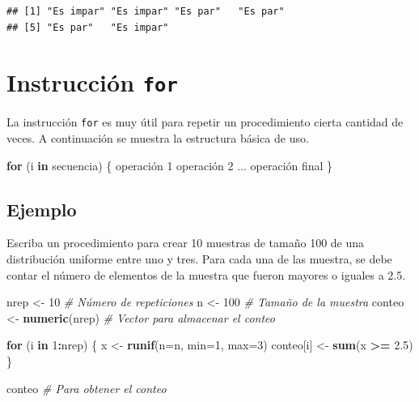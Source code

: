 \documentclass[10pt,]{krantz}
\makeatletter
\newenvironment{Shaded}{\begin{snugshade}}{\end{snugshade}}
\newcommand{\KeywordTok}[1]{\textcolor[rgb]{0.13,0.29,0.53}{\textbf{#1}}}
\newcommand{\DataTypeTok}[1]{\textcolor[rgb]{0.13,0.29,0.53}{#1}}
\newcommand{\DecValTok}[1]{\textcolor[rgb]{0.00,0.00,0.81}{#1}}
\newcommand{\FloatTok}[1]{\textcolor[rgb]{0.00,0.00,0.81}{#1}}
\newcommand{\StringTok}[1]{\textcolor[rgb]{0.31,0.60,0.02}{#1}}
\newcommand{\CommentTok}[1]{\textcolor[rgb]{0.56,0.35,0.01}{\textit{#1}}}
\newcommand{\ControlFlowTok}[1]{\textcolor[rgb]{0.13,0.29,0.53}{\textbf{#1}}}
\newcommand{\OperatorTok}[1]{\textcolor[rgb]{0.81,0.36,0.00}{\textbf{#1}}}
\newcommand{\NormalTok}[1]{#1}
\newenvironment{kframe}{%
\medskip{}
\setlength{\fboxsep}{.8em}
 \def\at@end@of@kframe{}%
 \ifinner\ifhmode%
  \def\at@end@of@kframe{\end{minipage}}%
  \begin{minipage}{\columnwidth}%
 \fi\fi%
 \def\FrameCommand##1{\hskip\@totalleftmargin \hskip-\fboxsep
 \colorbox{shadecolor}{##1}\hskip-\fboxsep
     \hskip-\linewidth \hskip-\@totalleftmargin \hskip\columnwidth}%
 \MakeFramed {\advance\hsize-\width
   \@totalleftmargin\z@ \linewidth\hsize
   \@setminipage}}%
 {\par\unskip\endMakeFramed%
 \at@end@of@kframe}
\renewenvironment{Shaded}{\begin{kframe}}{\end{kframe}}
\makeatother
\begin{document}
\begin{verbatim}
## [1] "Es impar" "Es impar" "Es par"   "Es par"  
## [5] "Es par"   "Es impar"
\end{verbatim}

\section{\texorpdfstring{Instrucción \texttt{for}
}{Instrucción for }}\label{instruccion-for}

La instrucción \texttt{for} es muy útil para repetir un procedimiento
cierta cantidad de veces. A continuación se muestra la estructura básica
de uso.

\begin{Shaded}
\begin{Highlighting}[]
\ControlFlowTok{for}\NormalTok{ (i }\ControlFlowTok{in}\NormalTok{ secuencia) \{}
\NormalTok{  operación }\DecValTok{1}
\NormalTok{  operación }\DecValTok{2}
\NormalTok{  ...}
\NormalTok{  operación final}
\NormalTok{\}}
\end{Highlighting}
\end{Shaded}

\subsection*{Ejemplo}\label{ejemplo-17}


Escriba un procedimiento para crear 10 muestras de tamaño 100 de una
distribución uniforme entre uno y tres. Para cada una de las muestra, se
debe contar el número de elementos de la muestra que fueron mayores o
iguales a 2.5.

\begin{Shaded}
\begin{Highlighting}[]
\NormalTok{nrep <-}\StringTok{ }\DecValTok{10}  \CommentTok{# Número de repeticiones}
\NormalTok{n <-}\StringTok{ }\DecValTok{100}    \CommentTok{# Tamaño de la muestra}
\NormalTok{conteo <-}\StringTok{ }\KeywordTok{numeric}\NormalTok{(nrep)  }\CommentTok{# Vector para almacenar el conteo}

\ControlFlowTok{for}\NormalTok{ (i }\ControlFlowTok{in} \DecValTok{1}\OperatorTok{:}\NormalTok{nrep) \{}
\NormalTok{  x <-}\StringTok{ }\KeywordTok{runif}\NormalTok{(}\DataTypeTok{n=}\NormalTok{n, }\DataTypeTok{min=}\DecValTok{1}\NormalTok{, }\DataTypeTok{max=}\DecValTok{3}\NormalTok{)}
\NormalTok{  conteo[i] <-}\StringTok{ }\KeywordTok{sum}\NormalTok{(x }\OperatorTok{>=}\StringTok{ }\FloatTok{2.5}\NormalTok{)}
\NormalTok{\}}

\NormalTok{conteo  }\CommentTok{# Para obtener el conteo}
\end{Highlighting}
\end{Shaded}
\end{document}
